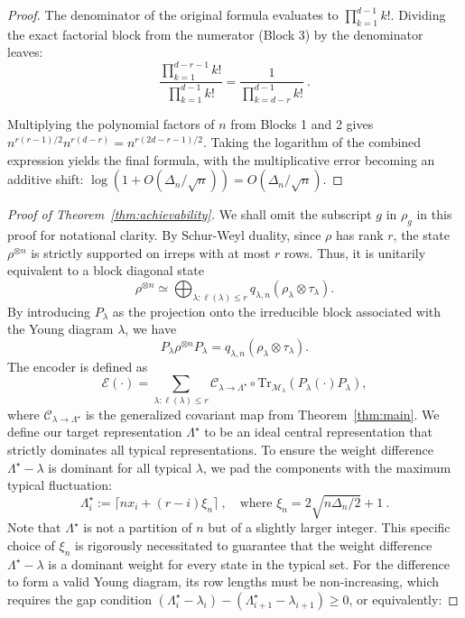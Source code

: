 \documentclass[a4paper,onecolumn,11pt]{quantumarticle}
\newcommand*{\Tr}{\mathrm{Tr}}
\def\map{\mathcal}
\begin{document}
\begin{proof}
The denominator of the original formula evaluates to $\prod_{k=1}^{d-1} k!$. Dividing the exact factorial block from the numerator (Block 3) by the denominator leaves:
\[
    \frac{\prod_{k=1}^{d-r-1} k!}{\prod_{k=1}^{d-1} k!} = \frac{1}{\prod_{k=d-r}^{d-1} k!} \ .
\]

Multiplying the polynomial factors of $n$ from Blocks 1 and 2 gives $n^{r(r-1)/2} n^{r(d-r)} = n^{r(2d-r-1)/2}$. Taking the logarithm of the combined expression yields the final formula, with the multiplicative error becoming an additive shift: $\log(1 + O(\Delta_n/\sqrt{n})) = O(\Delta_n/\sqrt{n})$.
\end{proof}


\begin{proof}[Proof of Theorem~\ref{thm:achievability}]
We shall omit the subscript $g$ in $\rho_g$ in this proof for notational clarity. By Schur-Weyl duality, since $\rho$ has rank $r$, the state $\rho^{\otimes n}$ is strictly supported on irreps with at most $r$ rows.  Thus, it is unitarily equivalent to a block diagonal state
\begin{equation}
    \rho^{\otimes n}\simeq\bigoplus_{\lambda : \ell(\lambda) \le r} q_{\lambda,n}\left(\rho_\lambda\otimes\tau_\lambda\right).
\end{equation}
By introducing $P_\lambda$ as the projection onto the irreducible block associated with the Young diagram $\lambda$, we have
\begin{equation}
    P_\lambda\rho^{\otimes n}P_\lambda = q_{\lambda,n}\left(\rho_\lambda\otimes\tau_\lambda\right).
\end{equation}
The encoder is defined as
\begin{equation}
    \map{E}(\cdot) = \sum_{\lambda : \ell(\lambda) \le r}\map{C}_{\lambda\to \Lambda^\star}\circ\Tr_{\map{M}_{\lambda}}(P_\lambda(\cdot)P_\lambda),
\end{equation}
where $\map{C}_{\lambda\to\Lambda^\star}$ is the generalized covariant map from Theorem~\ref{thm:main}. We define our target representation $\Lambda^\star$ to be an ideal central representation that strictly dominates all typical representations. To ensure the weight difference $\Lambda^\star - \lambda$ is dominant for all typical $\lambda$, we pad the components with the maximum typical fluctuation:
\begin{equation}
    \Lambda^\star_i :=   \lceil n x_i + (r-i)\xi_n \rceil \ , \quad \text{where } \xi_n = 2\sqrt{n\Delta_n/2} + 1 \ .
\end{equation}
Note that $\Lambda^\star$ is not a partition of $n$ but of a slightly larger integer. This specific choice of $\xi_n$ is rigorously necessitated to guarantee that the weight difference $\Lambda^\star - \lambda$ is a dominant weight for every state in the typical set. For the difference to form a valid Young diagram, its row lengths must be non-increasing, which requires the gap condition $(\Lambda^\star_i - \lambda_i) - (\Lambda^\star_{i+1} - \lambda_{i+1}) \ge 0$, or equivalently:

\end{proof}
\end{document}

